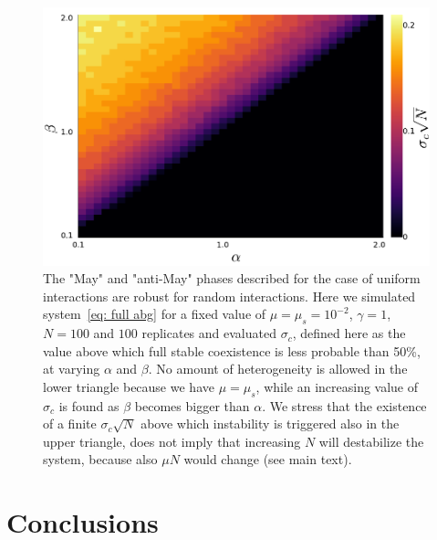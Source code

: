 \documentclass[
 reprint,
 amsmath,amssymb,
 aps,
]{revtex4-2}
\begin{document}
\begin{figure}[h!]
    \centering
    \includegraphics[width=.45\textwidth]{figs/alpha-beta.pdf}
    \caption{The "May" and "anti-May" phases described for the
    case of uniform interactions are robust for random interactions.
    Here we simulated system~\eqref{eq: full abg} for a fixed value of
    $\mu=\mu_s=10^{-2}$, $\gamma=1$, $N=100$ and $100$ replicates 
    and evaluated $\sigma_c$, defined here as
    the value above which full stable coexistence is less probable than 50\%,
    at varying $\alpha$ and $\beta$. No amount of heterogeneity is allowed in the
    lower triangle because we have $\mu=\mu_s$, while an increasing value of $\sigma_c$
    is found as $\beta$ becomes bigger than $\alpha$.
    We stress that the existence of a finite $\sigma_c\sqrt{N}$ above which
    instability is triggered also in the upper triangle,
    does not imply that increasing $N$ will
    destabilize the system, because also $\mu N$ would change (see main text).
    }
    \label{fig: alpha-beta}
\end{figure}
    


\section{Conclusions}

\clearpage




\end{document}
